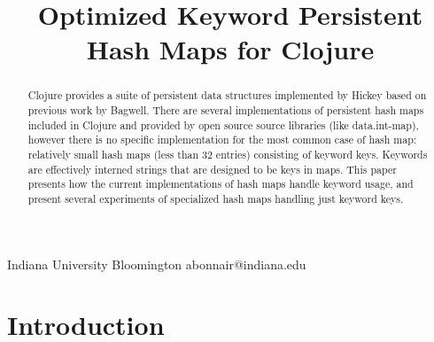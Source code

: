 \documentclass[preprint]{sigplanconf}
\begin{document}
\setlength{\pdfpageheight}{\paperheight}
\setlength{\pdfpagewidth}{\paperwidth}

%

           { Indiana University Bloomington }
           { abonnair@indiana.edu}


\title{Optimized Keyword Persistent Hash Maps for Clojure}

\maketitle

\begin{abstract}
Clojure provides a suite of persistent data structures
implemented by Hickey based on previous work by Bagwell.
There are several implementations of persistent hash maps
included in Clojure and provided by open source source libraries
(like data.int-map), however there is no specific
implementation for the most common case of hash map:
relatively small hash maps (less than 32 entries)
consisting of keyword keys.
Keywords are effectively interned strings that are designed
to be keys in maps.
This paper presents how the current implementations
of hash maps handle keyword usage, 
and present several experiments of specialized hash maps
handling just keyword keys.

\end{abstract}


\section{Introduction}
\end{document}
